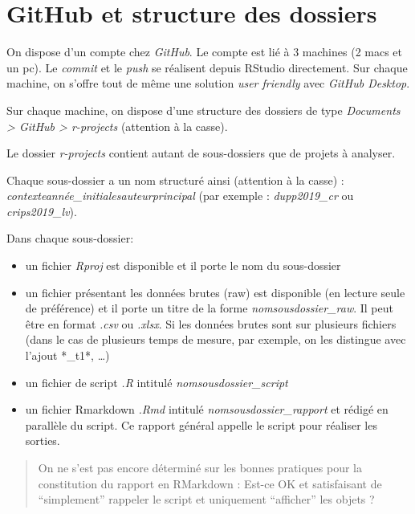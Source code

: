 \documentclass[
  letterpaper,
  DIV=11,
  numbers=noendperiod]{scrreprt}
\providecommand{\tightlist}{%
  \setlength{\itemsep}{0pt}\setlength{\parskip}{0pt}}\usepackage{longtable,booktabs,array}
\begin{document}
\hypertarget{github-et-structure-des-dossiers}{%
\section{GitHub et structure des
dossiers}\label{github-et-structure-des-dossiers}}

On dispose d'un compte chez \emph{GitHub}. Le compte est lié à 3
machines (2 macs et un pc). Le \emph{commit} et le \emph{push} se
réalisent depuis RStudio directement. Sur chaque machine, on s'offre
tout de même une solution \emph{user friendly} avec \emph{GitHub
Desktop}.

Sur chaque machine, on dispose d'une structure des dossiers de type
\emph{Documents \textgreater{} GitHub \textgreater{} r-projects}
(attention à la casse).

Le dossier \emph{r-projects} contient autant de sous-dossiers que de
projets à analyser.

Chaque sous-dossier a un nom structuré ainsi (attention à la casse) :
\emph{contexteannée\_initialesauteurprincipal} (par exemple :
\emph{dupp2019\_cr} ou \emph{crips2019\_lv}).

Dans chaque sous-dossier:

\begin{itemize}
\tightlist
\item
  un fichier \emph{Rproj} est disponible et il porte le nom du
  sous-dossier
\item
  un fichier présentant les données brutes (raw) est disponible (en
  lecture seule de préférence) et il porte un titre de la forme
  \emph{nomsousdossier\_raw}. Il peut être en format \emph{.csv} ou
  \emph{.xlsx}. Si les données brutes sont sur plusieurs fichiers (dans
  le cas de plusieurs temps de mesure, par exemple, on les distingue
  avec l'ajout *\_t1*, \ldots)
\item
  un fichier de script \emph{.R} intitulé \emph{nomsousdossier\_script}
\item
  un fichier Rmarkdown \emph{.Rmd} intitulé
  \emph{nomsousdossier\_rapport} et rédigé en parallèle du script. Ce
  rapport général appelle le script pour réaliser les sorties.
\end{itemize}

\begin{quote}
On ne s'est pas encore déterminé sur les bonnes pratiques pour la
constitution du rapport en RMarkdown : Est-ce OK et satisfaisant de
``simplement'' rappeler le script et uniquement ``afficher'' les objets
?
\end{quote}
\end{document}
